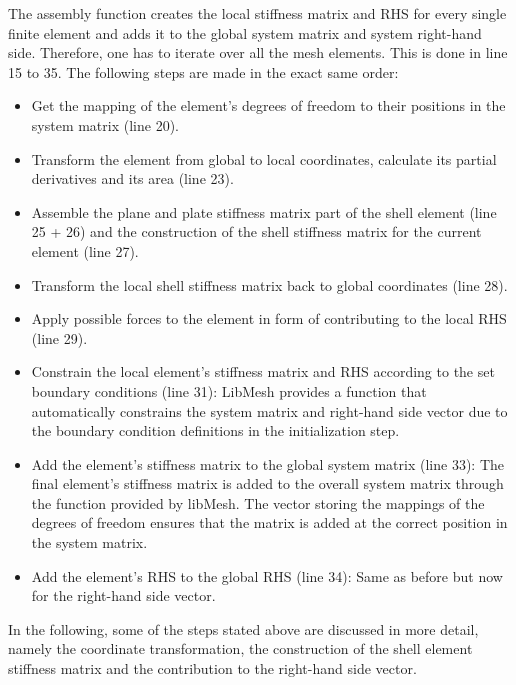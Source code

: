    The assembly function creates the local stiffness matrix and RHS for every single finite element and adds it to the global system matrix and system right-hand side. Therefore, one has to iterate over all the mesh elements. This is done in line 15 to 35. The following steps are made in the exact same order:
   \begin{itemize}
   	\item Get the mapping of the element's degrees of freedom to their positions in the system matrix (line 20).
   	\item Transform the element from global to local coordinates, calculate its partial derivatives and its area (line 23).
   	\item Assemble the plane and plate stiffness matrix part of the shell element (line 25 + 26) and the construction of the shell stiffness matrix for the current element (line 27).
   	\item Transform the local shell stiffness matrix back to global coordinates (line 28).
   	\item Apply possible forces to the element in form of contributing to the local RHS (line 29).
   	\item Constrain the local element's stiffness matrix and RHS according to the set boundary conditions (line 31): LibMesh provides a function that automatically constrains the system matrix and right-hand side vector due to the boundary condition definitions in the initialization step.
    \item Add the element's stiffness matrix to the global system matrix (line 33): The final element's stiffness matrix is added to the overall system matrix through the function provided by libMesh. The vector storing the mappings of the degrees of freedom ensures that the matrix is added at the correct position in the system matrix.
    \item Add the element's RHS to the global RHS (line 34): Same as before but now for the right-hand side vector.
   \end{itemize}
   In the following, some of the steps stated above are discussed in more detail, namely the coordinate transformation, the construction of the shell element stiffness matrix and the contribution to the right-hand side vector.
   
